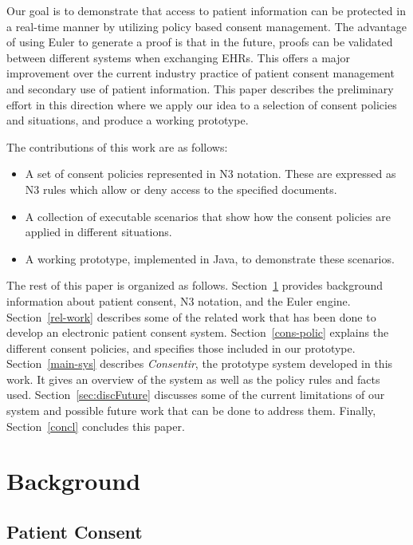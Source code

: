 \documentclass[conference]{IEEEtran}
\begin{document}
Our goal is to demonstrate that access to patient information can be protected in a real-time manner by utilizing policy based consent management.
The advantage of using Euler to generate a proof is that in the future, proofs can be validated between different systems when exchanging EHRs. This offers a
major improvement over the current industry practice of patient consent management and secondary use of patient information. This paper describes the
preliminary effort in this direction where we apply our idea to a selection of consent policies and situations, and produce a working prototype.


The contributions of this work are as follows: 

\begin{itemize}
    \item A set of consent policies represented in N3 notation. These are expressed as N3 rules which allow or deny access to the specified documents.

\item A collection of executable scenarios that show how the consent policies are applied in different situations.
\item A working prototype, implemented in Java, to demonstrate these scenarios.
\end{itemize}

The rest of this paper is organized as follows. Section~\ref{bg-sec} provides background information about patient consent, N3 notation, and the Euler engine.
Section~\ref{rel-work} describes some of the related work that has been done to develop an electronic patient consent system. Section~\ref{cons-polic} explains
the different consent policies, and specifies those included in our prototype. Section~\ref{main-sys} describes \textit{Consentir}, the prototype system
developed in this
work. It gives an overview of the system as well as the policy rules and facts used. Section~\ref{sec:discFuture} discusses some of the current
limitations of our system and possible future work that can be done to address them. Finally, Section~\ref{concl} concludes this paper.


\section{Background}
\label{bg-sec}

\subsection{Patient Consent}
\label{pat-consent}
\end{document}
